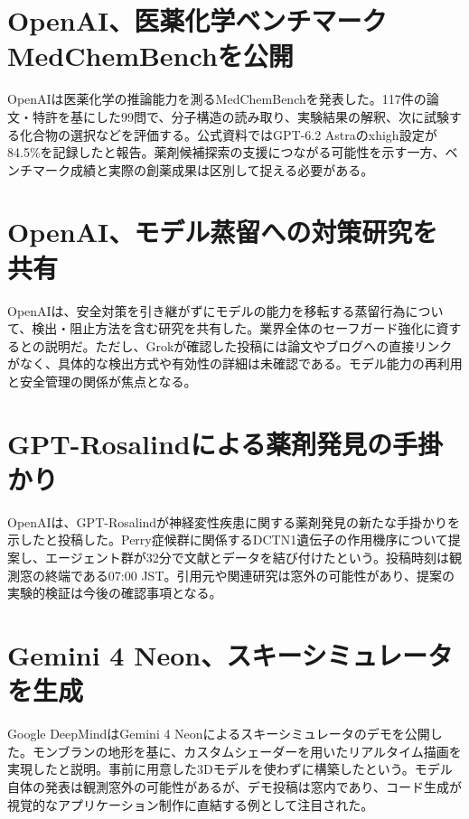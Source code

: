 \section{OpenAI、医薬化学ベンチマークMedChemBenchを公開}
OpenAIは医薬化学の推論能力を測るMedChemBenchを発表した。117件の論文・特許を基にした99問で、分子構造の読み取り、実験結果の解釈、次に試験する化合物の選択などを評価する。公式資料ではGPT-6.2 Astraのxhigh設定が84.5\%を記録したと報告。薬剤候補探索の支援につながる可能性を示す一方、ベンチマーク成績と実際の創薬成果は区別して捉える必要がある。

\section{OpenAI、モデル蒸留への対策研究を共有}
OpenAIは、安全対策を引き継がずにモデルの能力を移転する蒸留行為について、検出・阻止方法を含む研究を共有した。業界全体のセーフガード強化に資するとの説明だ。ただし、Grokが確認した投稿には論文やブログへの直接リンクがなく、具体的な検出方式や有効性の詳細は未確認である。モデル能力の再利用と安全管理の関係が焦点となる。

\section{GPT-Rosalindによる薬剤発見の手掛かり}
OpenAIは、GPT-Rosalindが神経変性疾患に関する薬剤発見の新たな手掛かりを示したと投稿した。Perry症候群に関係するDCTN1遺伝子の作用機序について提案し、エージェント群が32分で文献とデータを結び付けたという。投稿時刻は観測窓の終端である07:00 JST。引用元や関連研究は窓外の可能性があり、提案の実験的検証は今後の確認事項となる。

\section{Gemini 4 Neon、スキーシミュレータを生成}
Google DeepMindはGemini 4 Neonによるスキーシミュレータのデモを公開した。モンブランの地形を基に、カスタムシェーダーを用いたリアルタイム描画を実現したと説明。事前に用意した3Dモデルを使わずに構築したという。モデル自体の発表は観測窓外の可能性があるが、デモ投稿は窓内であり、コード生成が視覚的なアプリケーション制作に直結する例として注目された。

